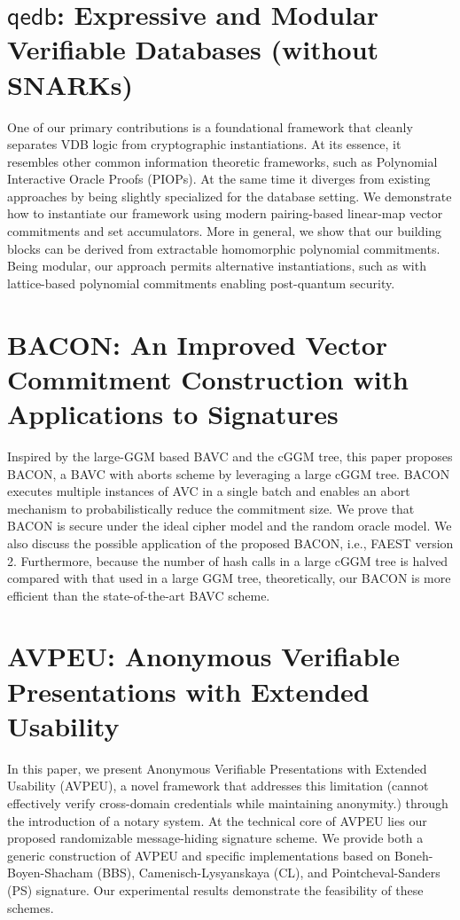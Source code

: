\documentclass[11pt,oneside]{book}
\theoremstyle{definition}
\theoremstyle{remark}
\theoremstyle{plain}
\begin{document}
\section{\cite{cryptoeprint:2025/1408} $\mathsf{qedb}$: Expressive and Modular Verifiable Databases (without {SNARKs})}
One of our primary contributions is a foundational framework that cleanly separates VDB logic from cryptographic instantiations. At its essence, it resembles other common information theoretic frameworks, such as Polynomial Interactive Oracle Proofs (PIOPs). At the same time it diverges from existing approaches by being slightly specialized for the database setting. We demonstrate how to instantiate our framework using modern pairing-based linear-map vector commitments and set accumulators. More in general, we show that our building blocks can be derived from extractable homomorphic polynomial commitments. Being  modular, our approach permits alternative instantiations, such as with lattice-based polynomial commitments enabling post-quantum security.

\section{\cite{cryptoeprint:2025/1411} BACON: An Improved Vector Commitment Construction with Applications to Signatures}
Inspired by the large-GGM based BAVC and the cGGM tree, this paper proposes BACON, a BAVC with aborts scheme by leveraging a large cGGM tree. BACON executes multiple instances of AVC in a single batch and enables an abort mechanism to probabilistically reduce the commitment size. We prove that BACON is secure under the ideal cipher model and the random oracle model. We also discuss the possible application of the proposed BACON, i.e., FAEST version 2. Furthermore, because the number of hash calls in a large cGGM tree is halved compared with that used in a large GGM tree, theoretically, our BACON is more efficient than the state-of-the-art BAVC scheme.

\section{\cite{cryptoeprint:2025/1412} AVPEU: Anonymous Verifiable Presentations with Extended Usability}

In this paper, we present Anonymous Verifiable Presentations with Extended Usability (AVPEU), a novel framework that addresses this limitation (cannot effectively verify cross-domain credentials while maintaining anonymity.) through the introduction of a notary system. At the technical core of AVPEU lies our proposed randomizable message-hiding signature scheme. We provide both a generic construction of AVPEU and specific implementations based on Boneh-Boyen-Shacham (BBS), Camenisch-Lysyanskaya (CL), and Pointcheval-Sanders (PS) signature. Our experimental results demonstrate the feasibility of these schemes.
\end{document}
